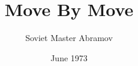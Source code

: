 \documentclass[letterpaper,twocolumn]{book}
\begin{document}
\author{Soviet Master Abramov}
\title{Move By Move}
\date{June 1973}




\frontmatter
\tableofcontents

\mainmatter
%


\backmatter
\end{document}
